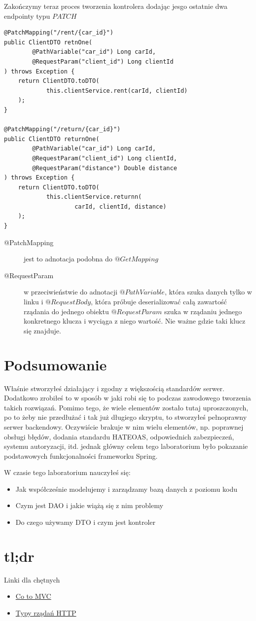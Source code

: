 \documentclass{article}
\begin{document}
                Zakończymy teraz proces tworzenia kontrolera dodając jesgo ostatnie dwa endpointy typu $PATCH$
                \begin{verbatim}
@PatchMapping("/rent/{car_id}")
public ClientDTO retnOne(
        @PathVariable("car_id") Long carId,
        @RequestParam("client_id") Long clientId
) throws Exception {
    return ClientDTO.toDTO(
            this.clientService.rent(carId, clientId)
    );
}

@PatchMapping("/return/{car_id}")
public ClientDTO returnOne(
        @PathVariable("car_id") Long carId,
        @RequestParam("client_id") Long clientId,
        @RequestParam("distance") Double distance
) throws Exception {
    return ClientDTO.toDTO(
            this.clientService.returnn(
                    carId, clientId, distance)
    );
}
                \end{verbatim}
                \begin{description}
                    \item[@PatchMapping] jest to adnotacja podobna do $@GetMapping$ 
                    \item[@RequestParam] w przeciwieństwie do adnotacji $@PathVariable$, która szuka danych tylko w linku i $@RequestBody$, która próbuje deserializować całą zawartość rządania do jednego obiektu $@RequestParam$ szuka w rządaniu jednego konkretnego klucza i wyciąga z niego wartość. Nie ważne gdzie taki klucz się znajduje. 
                \end{description}
    \section{Podsumowanie}
        Właśnie stworzyłeś działający i zgodny z większością standardów serwer. Dodatkowo zrobiłeś to w sposób w jaki robi się to podczas zawodowego tworzenia takich rozwiązań. Pomimo tego, że wiele elementów zostało tutaj uproszczonych, po to żeby nie przedłużać i tak już długiego skryptu, to stworzyłeś pełnoprawny serwer backendowy. Oczywiście brakuje w nim wielu elementów, np. poprawnej obsługi błędów, dodania standardu HATEOAS, odpowiednich zabezpieczeń, systemu autoryzacji, itd. jednak główny celem tego laboratorium było pokazanie podstawowych funkcjonalności frameworku Spring.
        
        W czasie tego laboratorium nauczyłeś się:
        \begin{itemize}
            \item Jak współcześnie modelujemy i zarządzamy bazą danych z poziomu kodu
            \item Czym jest DAO i jakie wiążą się z nim problemy
            \item Do czego używamy DTO i czym jest kontroler
        \end{itemize}
    \section{tl;dr}
        Linki dla chętnych
        \begin{itemize}
            \item \href{https://en.wikipedia.org/wiki/Model%E2%80%93view%E2%80%93controller}{Co to MVC}
            \item \href{https://developer.mozilla.org/en-US/docs/Web/HTTP/Methods}{Typy rządań HTTP}
        \end{itemize}
\end{document}
